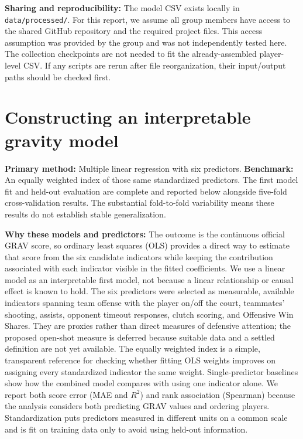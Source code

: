 \documentclass[11pt]{article}
\begin{document}
\textbf{Sharing and reproducibility:} The model CSV exists locally in
\texttt{data/processed/}. For this report, we assume all group members have
access to the shared GitHub repository and the required project files.
This access assumption was provided by the group and was not independently
tested here. The collection checkpoints are not needed to fit the
already-assembled player-level CSV. If any scripts are rerun after file
reorganization, their input/output paths should be checked first.

\section{Constructing an interpretable gravity model}
\textbf{Primary method:} Multiple linear regression with six predictors.
\textbf{Benchmark:} An equally weighted index of those same standardized predictors.
The first model fit and held-out evaluation are complete and reported
below alongside five-fold cross-validation results. The substantial
fold-to-fold variability means these results do not establish stable
generalization.

\textbf{Why these models and predictors:} The outcome is the continuous
official GRAV score, so ordinary least squares (OLS) provides a direct way
to estimate that score from the six candidate indicators while keeping the
contribution associated with each indicator visible in the fitted
coefficients. We use a linear model as an interpretable first model, not
because a linear relationship or causal effect is known to hold. The six
predictors were selected as measurable, available indicators spanning
team offense with the player on/off the court, teammates' shooting, assists,
opponent timeout responses, clutch scoring, and Offensive Win Shares.
They are proxies rather than direct measures of defensive attention; the
proposed open-shot measure is deferred because suitable data and a settled
definition are not yet available. The equally weighted index is a simple,
transparent reference for checking whether fitting OLS weights improves
on assigning every standardized indicator the same weight. Single-predictor
baselines show how the combined model compares with using one indicator
alone. We report both score error (MAE and $R^2$) and rank association
(Spearman) because the analysis considers both predicting GRAV values and
ordering players. Standardization puts predictors measured in different
units on a common scale and is fit on training data only to avoid using
held-out information.
\end{document}

